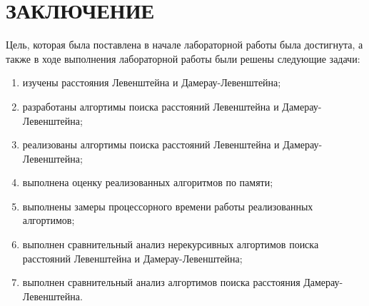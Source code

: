 \section*{ЗАКЛЮЧЕНИЕ}

Цель, которая была поставлена в начале лабораторной работы была достигнута, а также в ходе выполнения лабораторной работы были решены
следующие задачи:
\begin{enumerate}[leftmargin=1.6\parindent]
    \item изучены расстояния Левенштейна и Дамерау-Левенштейна;
    \item разработаны алгортимы поиска расстояний Левенштейна и Дамерау-Левенштейна;
    \item реализованы алгортимы поиска расстояний Левенштейна и Дамерау-Левенштейна;
    \item выполнена оценку реализованных алгоритмов по памяти;
    \item выполнены замеры процессорного времени работы реализованных алгортимов;
    \item выполнен сравнительный анализ нерекурсивных алгортимов поиска расстояний Левенштейна и Дамерау-Левенштейна;
    \item выполнен сравнительный анализ алгортимов поиска расстояния \newline Дамерау-Левенштейна.
\end{enumerate}

\pagebreak